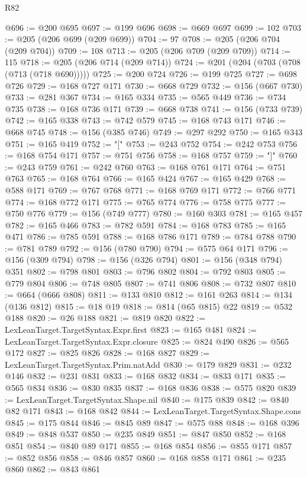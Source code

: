 \begin{lexlean}{R82}
\begin{coremodule}
@696 := @200 @695
@697 := @199 @696
@698 := @669 @697
@699 := 102
@703 := @205 (@206 @699 (@209 @699))
@704 := 97
@708 := @205 (@206 @704 (@209 @704))
@709 := 108
@713 := @205 (@206 @709 (@209 @709))
@714 := 115
@718 := @205 (@206 @714 (@209 @714))
@724 := @201 (@204 (@703 (@708 (@713 (@718 @690)))))
@725 := @200 @724
@726 := @199 @725
@727 := @698 @726
@729 := @168 @727 @171
@730 := @668 @729
@732 := @156 (@667 @730)
@733 := @281 @367
@734 := @165 @334
@735 := @565 @449
@736 := @734 @735
@738 := @168 @736 @171
@739 := @668 @738
@741 := @156 (@733 @739)
@742 := @165 @338
@743 := @742 @579
@745 := @168 @743 @171
@746 := @668 @745
@748 := @156 (@385 @746)
@749 := @297 @292
@750 := @165 @343
@751 := @165 @419
@752 := "["
@753 := @243 @752
@754 := @242 @753
@756 := @168 @754 @171
@757 := @751 @756
@758 := @168 @757
@759 := "]"
@760 := @243 @759
@761 := @242 @760
@763 := @168 @761 @171
@764 := @751 @763
@765 := @168 @764
@766 := @165 @424
@767 := @165 @429
@768 := @588 @171
@769 := @767 @768
@771 := @168 @769 @171
@772 := @766 @771
@774 := @168 @772 @171
@775 := @765 @774
@776 := @758 @775
@777 := @750 @776
@779 := @156 (@749 @777)
@780 := @160 @303
@781 := @165 @457
@782 := @165 @466
@783 := @782 @591
@784 := @168 @783
@785 := @165 @471
@786 := @785 @591
@788 := @168 @786 @171
@789 := @784 @788
@790 := @781 @789
@792 := @156 (@780 @790)
@794 := @575 @64 @171
@796 := @156 (@309 @794)
@798 := @156 (@326 @794)
@801 := @156 (@348 @794) @351
@802 := @798 @801
@803 := @796 @802
@804 := @792 @803
@805 := @779 @804
@806 := @748 @805
@807 := @741 @806
@808 := @732 @807
@810 := @664 (@666 @808)
@811 := @133 @810
@812 := @161 @263
@814 := @134 (@136 @812)
@815 := @18 @19
@818 := @814 (@65 @815) @22
@819 := @532 @188
@820 := @26 @188
@821 := @819 @820
@822 := LexLeanTarget.TargetSyntax.Expr.first
@823 := @165 @481
@824 := LexLeanTarget.TargetSyntax.Expr.closure
@825 := @824 @490
@826 := @565 @172
@827 := @825 @826
@828 := @168 @827
@829 := LexLeanTarget.TargetSyntax.Prim.natAdd
@830 := @179 @829
@831 := @232 @146
@832 := @231 @831
@833 := @168 @832
@834 := @833 @171
@835 := @565 @834
@836 := @830 @835
@837 := @168 @836
@838 := @575 @820
@839 := LexLeanTarget.TargetSyntax.Shape.nil
@840 := @175 @839
@842 := @840 @82 @171
@843 := @168 @842
@844 := LexLeanTarget.TargetSyntax.Shape.cons
@845 := @175 @844
@846 := @845 @89
@847 := @575 @88
@848 := @168 @396
@849 := @848 @537
@850 := @235 @849
@851 := @847 @850
@852 := @168 @851
@854 := @840 @89 @171
@855 := @168 @854
@856 := @855 @171
@857 := @852 @856
@858 := @846 @857
@860 := @168 @858 @171
@861 := @235 @860
@862 := @843 @861

\end{coremodule}
\end{lexlean}
